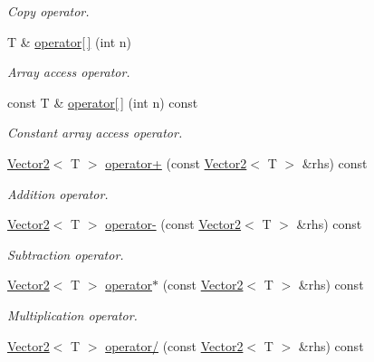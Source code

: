 \begin{DoxyCompactItemize}
\begin{DoxyCompactList}\small\item\em Copy operator. \item\end{DoxyCompactList}\item 
T \& \hyperlink{class_vector2_a7d7e7b0abc5433808832147bfd58c171}{operator\mbox{[}$\,$\mbox{]}} (int n)
\begin{DoxyCompactList}\small\item\em Array access operator. \item\end{DoxyCompactList}\item 
const T \& \hyperlink{class_vector2_a33a7b603ccfa18de8524effcb18388df}{operator\mbox{[}$\,$\mbox{]}} (int n) const 
\begin{DoxyCompactList}\small\item\em Constant array access operator. \item\end{DoxyCompactList}\item 
\hyperlink{class_vector2}{Vector2}$<$ T $>$ \hyperlink{class_vector2_a481bea0de6a8060118b48a4f2516e329}{operator+} (const \hyperlink{class_vector2}{Vector2}$<$ T $>$ \&rhs) const 
\begin{DoxyCompactList}\small\item\em Addition operator. \item\end{DoxyCompactList}\item 
\hyperlink{class_vector2}{Vector2}$<$ T $>$ \hyperlink{class_vector2_acb95b5aa975ef2eccaafc9314ed31373}{operator-\/} (const \hyperlink{class_vector2}{Vector2}$<$ T $>$ \&rhs) const 
\begin{DoxyCompactList}\small\item\em Subtraction operator. \item\end{DoxyCompactList}\item 
\hyperlink{class_vector2}{Vector2}$<$ T $>$ \hyperlink{class_vector2_a400c2c32b1b54f5423ddcb6e24d90c6a}{operator$\ast$} (const \hyperlink{class_vector2}{Vector2}$<$ T $>$ \&rhs) const 
\begin{DoxyCompactList}\small\item\em Multiplication operator. \item\end{DoxyCompactList}\item 
\hyperlink{class_vector2}{Vector2}$<$ T $>$ \hyperlink{class_vector2_a7ca23b6847d15c9e0b8544071c08a0c9}{operator/} (const \hyperlink{class_vector2}{Vector2}$<$ T $>$ \&rhs) const 

\end{DoxyCompactItemize}
